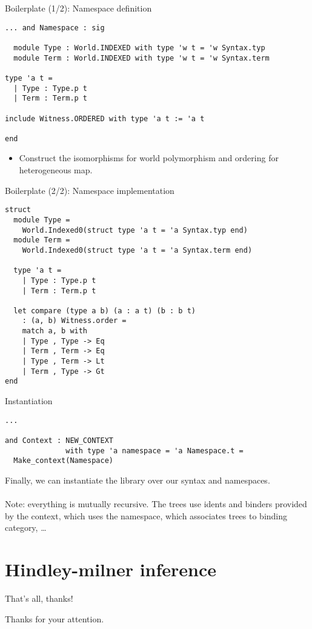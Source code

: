 \documentclass{beamer}          %
\begin{document}
\begin{frame}[fragile]{Boilerplate (1/2): Namespace definition}

\begin{lstlisting}[xleftmargin=-0.2in]
... and Namespace : sig

  module Type : World.INDEXED with type 'w t = 'w Syntax.typ
  module Term : World.INDEXED with type 'w t = 'w Syntax.term

type 'a t =
  | Type : Type.p t
  | Term : Term.p t

include Witness.ORDERED with type 'a t := 'a t

end
\end{lstlisting}

\begin{itemize}
  \item Construct the isomorphisms for world polymorphism and ordering for heterogeneous map.
\end{itemize}
\end{frame}

\begin{frame}[fragile]{Boilerplate (2/2): Namespace implementation}

\begin{lstlisting}[xleftmargin=-0.2in]
struct
  module Type =
    World.Indexed0(struct type 'a t = 'a Syntax.typ end)
  module Term =
    World.Indexed0(struct type 'a t = 'a Syntax.term end)

  type 'a t =
    | Type : Type.p t
    | Term : Term.p t

  let compare (type a b) (a : a t) (b : b t)
    : (a, b) Witness.order =
    match a, b with
    | Type , Type -> Eq
    | Term , Term -> Eq
    | Type , Term -> Lt
    | Term , Type -> Gt
end
\end{lstlisting}

\end{frame}

\begin{frame}[fragile]{Instantiation}

\begin{lstlisting}
...

and Context : NEW_CONTEXT
              with type 'a namespace = 'a Namespace.t =
  Make_context(Namespace)
\end{lstlisting}

Finally, we can instantiate the library over our syntax and namespaces. \\~\\

Note: everything is mutually recursive. The trees use idents and binders provided by the context, which uses the namespace, which associates trees to binding category, \ldots

\end{frame}

\section{Hindley-milner inference}

\begin{frame}{That's all, thanks!}

  Thanks for your attention.

\end{frame}
\end{document}
